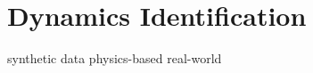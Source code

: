 \section{Dynamics Identification} 
\label{sec:experiments:dynamics_identification}

synthetic data
physics-based
real-world

